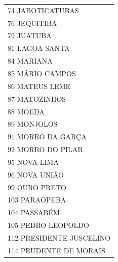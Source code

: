 \documentclass{article}
\begin{document}
\begin{longtable}[c]{m{18cm}}
\multicolumn{1}{l}{ \hspace{2em} 74 JABOTICATUBAS } \\
\multicolumn{1}{l}{ \hspace{2em} 76 JEQUITIBÁ } \\
\multicolumn{1}{l}{ \hspace{2em} 79 JUATUBA } \\
\multicolumn{1}{l}{ \hspace{2em} 81 LAGOA SANTA } \\
\multicolumn{1}{l}{ \hspace{2em} 84 MARIANA } \\
\multicolumn{1}{l}{ \hspace{2em} 85 MÁRIO CAMPOS } \\
\multicolumn{1}{l}{ \hspace{2em} 86 MATEUS LEME } \\
\multicolumn{1}{l}{ \hspace{2em} 87 MATOZINHOS } \\
\multicolumn{1}{l}{ \hspace{2em} 88 MOEDA } \\
\multicolumn{1}{l}{ \hspace{2em} 89 MONJOLOS } \\
\multicolumn{1}{l}{ \hspace{2em} 91 MORRO DA GARÇA } \\
\multicolumn{1}{l}{ \hspace{2em} 92 MORRO DO PILAR } \\
\multicolumn{1}{l}{ \hspace{2em} 95 NOVA LIMA } \\
\multicolumn{1}{l}{ \hspace{2em} 96 NOVA UNIÃO } \\
\multicolumn{1}{l}{ \hspace{2em} 99 OURO PRETO } \\
\multicolumn{1}{l}{ \hspace{2em} 103 PARAOPEBA } \\
\multicolumn{1}{l}{ \hspace{2em} 104 PASSABÉM } \\
\multicolumn{1}{l}{ \hspace{2em} 105 PEDRO LEOPOLDO } \\
\multicolumn{1}{l}{ \hspace{2em} 112 PRESIDENTE JUSCELINO } \\
\multicolumn{1}{l}{ \hspace{2em} 114 PRUDENTE DE MORAIS } \\

\end{longtable}
\end{document}
